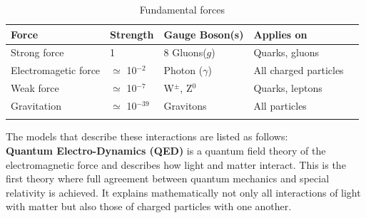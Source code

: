 \begin{table}[h!]
\centering
\begin{tabular}{lllll}
\hline
Force & Strength & Gauge Boson(s) & Applies on\\
\hline \noalign{\smallskip}
Strong force & 1 &8 Gluons($g$) & Quarks, gluons \\
\hline \noalign{\smallskip}
Electromagetic force &  $\simeq$ 10$^{-2}$ & Photon ($\gamma$) & All charged particles \\
\hline \noalign{\smallskip}
Weak force &  $\simeq$ 10$^{-7}$ & W$^{\pm}$, Z$^{0}$ & Quarks, leptons \\
\hline\noalign{\smallskip}
Gravitation &  $\simeq$ 10$^{-39}$ & Gravitons & All  particles \\
\noalign{\smallskip}
\end{tabular}
\caption{Fundamental forces}\label{table:force}
\end{table}




The models that describe these interactions are listed as follows: \\

\textbf{Quantum Electro-Dynamics (QED)} is a quantum field theory of the electromagnetic force and describes how light and matter interact. This is the first theory where full agreement between quantum mechanics and special relativity is achieved. It explains mathematically not only all interactions of light with matter but also those of charged particles with one another.\\

